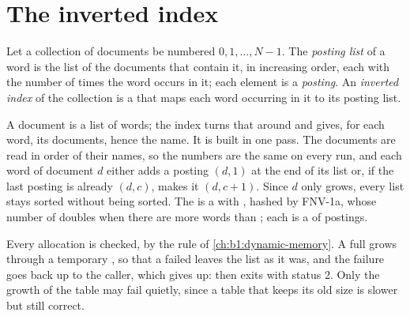 \section{The inverted index}\label{sec:b1:project-text-search-engine:index}

\begin{definition}\label{def:b1:project-text-search-engine:inverted-index}
Let a collection of documents be numbered $0, 1, \dots, N - 1$. The \emph{posting list} of a word
is the list of the documents that contain it, in increasing order, each with the number of times the word occurs in
it; each element is a \emph{posting}. An \emph{inverted index} of the collection is a 
that maps each word occurring in it to its posting list.
\end{definition}

A document is a list of words; the index turns that around and gives, for each word, its documents, hence the name.
It is built in one pass. The documents are read in order of their names, so the numbers are the same on every run, and
each word of document $d$ either adds a posting $(d, 1)$ at the end of its list or, if the last posting is already
$(d, c)$, makes it $(d, c + 1)$. Since $d$ only grows, every list stays sorted without being sorted. The  is
a  with , hashed by FNV-1a, whose number of  doubles when there are more words than
; each  is a  of postings.

\label{lst:b1:project-text-search-engine:index-h}

\label{lst:b1:project-text-search-engine:index}

Every allocation is checked, by the rule of \cref{ch:b1:dynamic-memory}. A full  grows through a temporary
, so that a failed  leaves the list as it was, and the failure goes back up to the caller, which
gives up:  then exits with status 2. Only the growth of the table may fail quietly, since a table that
keeps its old size is slower but still correct.

